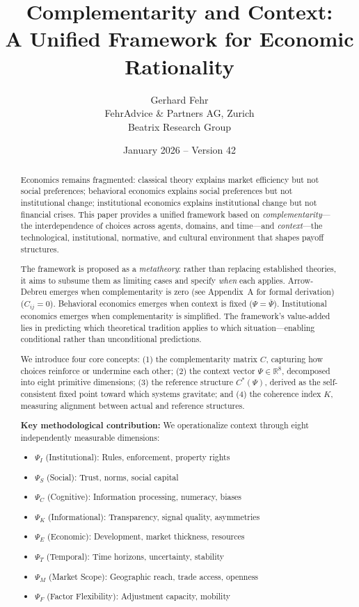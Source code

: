 \documentclass[12pt,a4paper]{article}
\title{Complementarity and Context:\\
A Unified Framework for Economic Rationality}
\author{Gerhard Fehr\\
FehrAdvice \& Partners AG, Zurich\\
Beatrix Research Group}
\date{January 2026 -- Version 42}
\begin{document}
\maketitle

\begin{abstract}
Economics remains fragmented: classical theory explains market efficiency but not social preferences; behavioral economics explains social preferences but not institutional change; institutional economics explains institutional change but not financial crises. This paper provides a unified framework based on \emph{complementarity}---the interdependence of choices across agents, domains, and time---and \emph{context}---the technological, institutional, normative, and cultural environment that shapes payoff structures.

The framework is proposed as a \emph{metatheory}: rather than replacing established theories, it aims to subsume them as limiting cases and specify \emph{when} each applies. Arrow-Debreu emerges when complementarity is zero (see Appendix~A for formal derivation) ($C_{ij} = 0$). Behavioral economics emerges when context is fixed ($\Psi = \bar{\Psi}$). Institutional economics emerges when complementarity is simplified. The framework's value-added lies in predicting which theoretical tradition applies to which situation---enabling conditional rather than unconditional predictions.

We introduce four core concepts: (1) the complementarity matrix $C$, capturing how choices reinforce or undermine each other; (2) the context vector $\Psi \in \mathbb{R}^8$, decomposed into eight primitive dimensions; (3) the reference structure $C^*(\Psi)$, derived as the self-consistent fixed point toward which systems gravitate; and (4) the coherence index $K$, measuring alignment between actual and reference structures.

\textbf{Key methodological contribution:} We operationalize context through eight independently measurable dimensions:
\begin{itemize}
    \item $\Psi_I$ (Institutional): Rules, enforcement, property rights
    \item $\Psi_S$ (Social): Trust, norms, social capital
    \item $\Psi_C$ (Cognitive): Information processing, numeracy, biases
    \item $\Psi_K$ (Informational): Transparency, signal quality, asymmetries
    \item $\Psi_E$ (Economic): Development, market thickness, resources
    \item $\Psi_T$ (Temporal): Time horizons, uncertainty, stability
    \item $\Psi_M$ (Market Scope): Geographic reach, trade access, openness
    \item $\Psi_F$ (Factor Flexibility): Adjustment capacity, mobility
\end{itemize}


\end{abstract}
\end{document}
